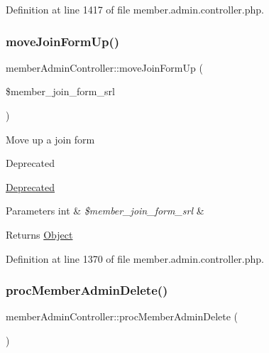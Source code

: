 Definition at line 1417 of file member.\+admin.\+controller.\+php.

\mbox{\label{classmemberAdminController_a6ab62c7dab973a7dc4d12b7739d82660}} 
\subsubsection{\texorpdfstring{move\+Join\+Form\+Up()}{moveJoinFormUp()}}
{\footnotesize\ttfamily member\+Admin\+Controller\+::move\+Join\+Form\+Up (\begin{DoxyParamCaption}\item[{}]{\$member\+\_\+join\+\_\+form\+\_\+srl }\end{DoxyParamCaption})}

Move up a join form \begin{DoxyRefDesc}{Deprecated}
\item[\hyperlink{deprecated__deprecated000023}{Deprecated}]\end{DoxyRefDesc}

\begin{DoxyParams}[1]{Parameters}
int & {\em \$member\+\_\+join\+\_\+form\+\_\+srl} & \\
\hline
\end{DoxyParams}
\begin{DoxyReturn}{Returns}
\hyperlink{classObject}{Object} 
\end{DoxyReturn}


Definition at line 1370 of file member.\+admin.\+controller.\+php.

\mbox{\label{classmemberAdminController_abbab5de7009e650ce1ca96d335e9b7be}} 
\subsubsection{\texorpdfstring{proc\+Member\+Admin\+Delete()}{procMemberAdminDelete()}}
{\footnotesize\ttfamily member\+Admin\+Controller\+::proc\+Member\+Admin\+Delete (\begin{DoxyParamCaption}{ }\end{DoxyParamCaption})}

